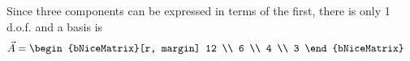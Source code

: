 \begin{enumerate}
Since three components can be expressed in terms of the first, there is only
1 d.o.f. and a basis is
\begin{align}
\vec{A} & = \begin{bNiceMatrix}[r, margin]
12 \\ 6 \\ 4 \\ 3
\end{bNiceMatrix}
\end{align}

\end{enumerate}